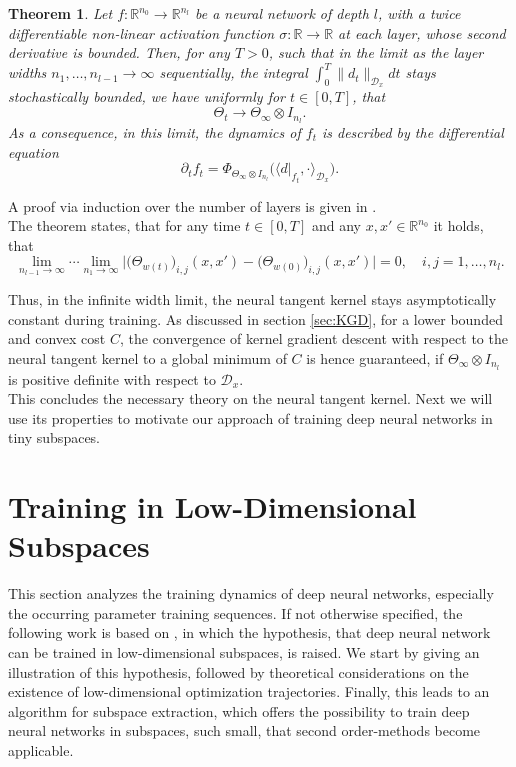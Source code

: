 \documentclass[11pt, a4paper]{article}
\newtheorem{theorem}{Theorem}[section]
\newcommand{\R}{\mathbb{R}}
\newcommand{\D}{\mathcal{D}}
\begin{document}
\begin{theorem} \label{thm:ntk}
Let $f: \R^{n_0} \to \R^{n_l}$ be a neural network of depth $l$, with a twice differentiable non-linear activation function $\sigma : \R \to \R$ at each layer, whose second derivative is bounded. Then, for any $T>0$, such that in the limit as the layer widths $n_1, \dots, n_{l-1} \to \infty$ sequentially, the integral $\int_{0}^{T} \| d_t \|_{\D_x}dt$ stays stochastically bounded, we have uniformly for $t \in [0,T]$, that
\[ \Theta_t \to \Theta_{\infty} \otimes I_{n_l}. \]
As a consequence, in this limit, the dynamics of $f_t$ is described by the differential equation
\[ \partial_tf_t = \Phi_{\Theta_{\infty} \otimes I_{n_l}} \Big ( \big \langle d|_{f_t}, \cdot \big \rangle_{\D_x} \Big ). \]
\end{theorem}

A proof via induction over the number of layers is given in \cite{NTK}. \\

The theorem states, that for any time $t \in [0,T]$ and any $x,x' \in \R^{n_0}$ it holds, that
\[ \lim_{n_{l-1} \to \infty} \cdots \lim_{n_1 \to \infty} \Big | \big (\Theta_{w(t)} \big )_{i,j}(x,x') - \big (\Theta_{w(0)} \big )_{i,j}(x,x') \Big | = 0, \quad i,j=1,\dots,n_l. \]

Thus, in the infinite width limit, the neural tangent kernel stays asymptotically constant during training. As discussed in section \ref{sec:KGD}, for a lower bounded and convex cost $C$, the convergence of kernel gradient descent with respect to the neural tangent kernel to a global minimum of $C$ is hence guaranteed, if $\Theta_{\infty} \otimes I_{n_l}$ is positive definite with respect to $\D_x$. \\

This concludes the necessary theory on the neural tangent kernel. Next we will use its properties to motivate our approach of training deep neural networks in tiny subspaces.

\pagebreak
\section{Training in Low-Dimensional Subspaces}

This section analyzes the training dynamics of deep neural networks, especially the occurring parameter training sequences.
If not otherwise specified, the following work is based on \cite{Paper}, in which the hypothesis, that deep neural network can be trained in low-dimensional subspaces, is raised. We start by giving an illustration of this hypothesis, followed by theoretical considerations on the existence of low-dimensional optimization trajectories. Finally, this leads to an algorithm for subspace extraction, which offers the possibility to train deep neural networks in subspaces, such small, that second order-methods become applicable.
\end{document}
